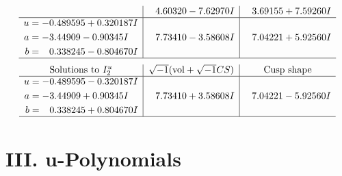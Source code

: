 \documentclass[1p]{elsarticle_modified}
\theoremstyle{definition}
\newcommand{\I}{\sqrt{-1}}
\begin{document}
$$\begin{array}{c|c|c}
 & \phantom{-}4.60320 - 7.62970 I & \phantom{-}3.69155 + 7.59260 I \\ \hline\begin{aligned}
u &= -0.489595 + 0.320187 I \\
a &= -3.44909 - 0.90345 I \\
b &= \phantom{-}0.338245 - 0.804670 I\end{aligned}
 & \phantom{-}7.73410 - 3.58608 I & \phantom{-}7.04221 + 5.92560 I\\
 \hline 
 \end{array}$$\newpage$$\begin{array}{c|c|c}  
\text{Solutions to }I^u_{2}& \I (\text{vol} + \sqrt{-1}CS) & \text{Cusp shape}\\
 \hline 
\begin{aligned}
u &= -0.489595 - 0.320187 I \\
a &= -3.44909 + 0.90345 I \\
b &= \phantom{-}0.338245 + 0.804670 I\end{aligned}
 & \phantom{-}7.73410 + 3.58608 I & \phantom{-}7.04221 - 5.92560 I\\
 \hline 
 \end{array}$$\newpage
\newpage\renewcommand{\arraystretch}{1}
\centering \section*{ III. u-Polynomials}
\end{document}
